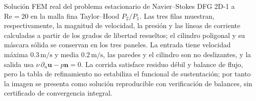 \caption{Solución FEM real del problema estacionario de Navier--Stokes
DFG 2D-1 a $\mathrm{Re}=20$ en la malla fina Taylor--Hood $P_2/P_1$.
Las tres filas muestran, respectivamente, la magnitud de velocidad, la
presión y las líneas de corriente calculadas a partir de los grados de
libertad resueltos; el cilindro poligonal y su máscara sólida se conservan en
los tres paneles. La entrada tiene velocidad máxima $0.3\,\mathrm{m/s}$ y
media $0.2\,\mathrm{m/s}$, las paredes y el cilindro son no deslizantes, y la
salida usa $\nu\,\partial_n\mathbf u-p\mathbf n=0$. La corrida satisface
residuo débil y balance de flujo, pero la tabla de refinamiento no estabiliza
el funcional de sustentación; por tanto la imagen se presenta como solución
reproducible con verificación de balances, sin certificado de convergencia
integral.}
